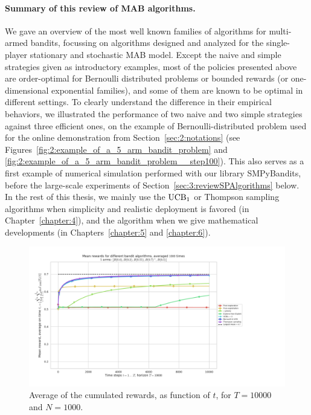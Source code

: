 \paragraph{Summary of this review of MAB algorithms.}
%
We gave an overview of the most well known families of algorithms for multi-armed bandits,
focussing on algorithms designed and analyzed for the single-player stationary and stochastic MAB model.
Except the naive and simple strategies given as introductory examples, most of the policies presented above are order-optimal for Bernoulli distributed problems or bounded rewards (or one-dimensional exponential families),
and some of them are known to be optimal in different settings.
%
To clearly understand the difference in their empirical behaviors, we illustrated the performance of two naive and two simple strategies against three efficient ones, on the example of Bernoulli-distributed problem used for the online demonstration from Section~\ref{sec:2:notations} (see Figures~\ref{fig:2:example_of_a_5_arm_bandit_problem} and \ref{fig:2:example_of_a_5_arm_bandit_problem__step100}).
This also serves as a first example of numerical simulation performed with our library SMPyBandits, before the large-scale experiments of Section~\ref{sec:3:reviewSPAlgorithms} below.
%
In the rest of this thesis, we mainly use the $\mathrm{UCB}_1$ or Thompson sampling algorithms when simplicity and realistic deployment is favored (in Chapter~\ref{chapter:4}), and the \klUCB{} algorithm when we give mathematical developments (in Chapters~\ref{chapter:5} and \ref{chapter:6}).



\begin{figure}[h!]  %
    \includegraphics[width=1.20\linewidth]{SP__K5_T10000_N1000__7_algos/main_MeanRewards____env1-1_2506036032481767447.pdf}
	\caption{Average of the cumulated rewards, as function of $t$, for $T=10000$ and $N=1000$.}
	\label{fig:2:meanRewardsAsFunctionOfTimeForDifferentAlgorithmsT10000N1000}
\end{figure}

